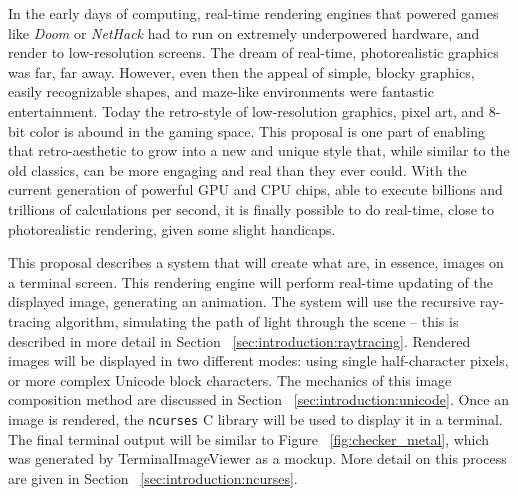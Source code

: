 \documentclass[11pt]{article}
\begin{document}

In the early days of computing, real-time rendering engines that powered games like {\it Doom} or {\it NetHack} had to run on extremely underpowered hardware, and render to low-resolution screens.
The dream of real-time, photorealistic graphics was far, far away.
However, even then the appeal of simple, blocky graphics, easily recognizable shapes, and maze-like environments were fantastic entertainment.
Today the retro-style of low-resolution graphics, pixel art, and 8-bit color is abound in the gaming space.
This proposal is one part of enabling that retro-aesthetic to grow into a new and unique style that, while similar to the old classics, can be more engaging and real than they ever could.
With the current generation of powerful GPU and CPU chips, able to execute billions and trillions of calculations per second, it is finally possible to do real-time, close to photorealistic rendering, given some slight handicaps.


This proposal describes a system that will create what are, in essence, images on a terminal screen.
This rendering engine will perform real-time updating of the displayed image, generating an animation.
The system will use the recursive ray-tracing algorithm, simulating the path of light through the scene -- this is described in more detail in Section ~\ref{sec:introduction:raytracing}.
Rendered images will be displayed in two different modes: using single half-character pixels, or more complex Unicode block characters.
The mechanics of this image composition method are discussed in Section ~\ref{sec:introduction:unicode}.
Once an image is rendered, the \texttt{ncurses} C library \cite{ncursesLibrary} will be used to display it in a terminal.
The final terminal output will be similar to Figure ~\ref{fig:checker_metal}, which was generated by TerminalImageViewer \cite{tivGithub} as a mockup.
More detail on this process are given in Section ~\ref{sec:introduction:ncurses}.
\end{document}
